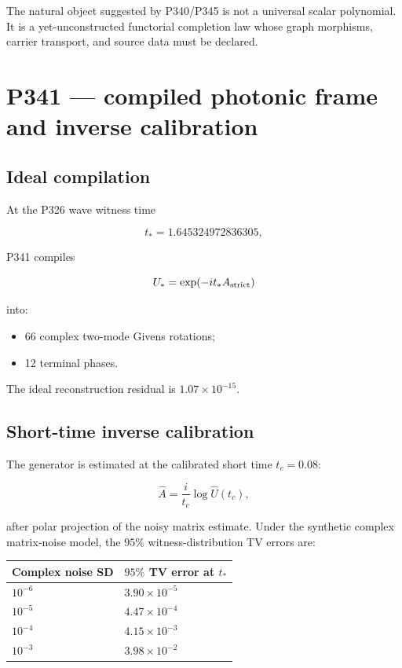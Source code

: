\documentclass[11pt,a4paper,openany]{report}
\begin{document}
The natural object suggested by P340/\allowbreak{}P345 is not a universal scalar polynomial. It is a yet-unconstructed functorial completion law whose graph morphisms, carrier transport, and source data must be declared.

\chapter{P341 --- compiled photonic frame and inverse calibration}

\section{Ideal compilation}

At the P326 wave witness time

\[
t_*=1.645324972836305,
\]

P341 compiles

\[
U_*=\exp(-it_*A_{\rm strict})
\]

into:

\begin{itemize}
\item 
66 complex two-mode Givens rotations;

\item 
12 terminal phases.

\end{itemize}

The ideal reconstruction residual is \(1.07\times10^{-15}\).

\section{Short-time inverse calibration}

The generator is estimated at the calibrated short time \(t_c=0.08\):

\[
\widehat A=\frac{i}{t_c}\log\widehat U(t_c),
\]

after polar projection of the noisy matrix estimate. Under the synthetic complex matrix-noise model, the \(95\%\) witness-distribution TV errors are:

\begin{center}
\begingroup\small
\setlength{\tabcolsep}{2.5pt}
\renewcommand{\arraystretch}{1.16}
\begin{longtable}{@{}p{}p{}@{}}
\toprule
\textbf{Complex noise SD} & \textbf{\(95\%\) TV error at \(t_*\)} \\
\midrule
\endhead
\(10^{-6}\) & \(3.90\times10^{-5}\) \\
\(10^{-5}\) & \(4.47\times10^{-4}\) \\
\(10^{-4}\) & \(4.15\times10^{-3}\) \\
\(10^{-3}\) & \(3.98\times10^{-2}\) \\
\bottomrule
\end{longtable}
\endgroup
\end{center}
\end{document}
